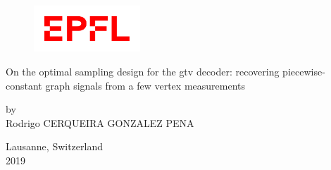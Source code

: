 \begin{titlepage}

\centering

\begin{figure}
	{\raggedright\includegraphics[width=4cm]{images/epfl}}
\end{figure}

\vspace*{\fill}

\begin{minipage}{0.9\textwidth}
	\centering
	\huge
	On the optimal sampling design for the \acrlong{gtv} decoder: recovering piecewise-constant graph signals from a few vertex measurements
\end{minipage}

\vspace*{\fill}

by\\
{\large Rodrigo CERQUEIRA GONZALEZ PENA}\\

\vspace*{\fill}

Lausanne, Switzerland\\
2019

\end{titlepage}



